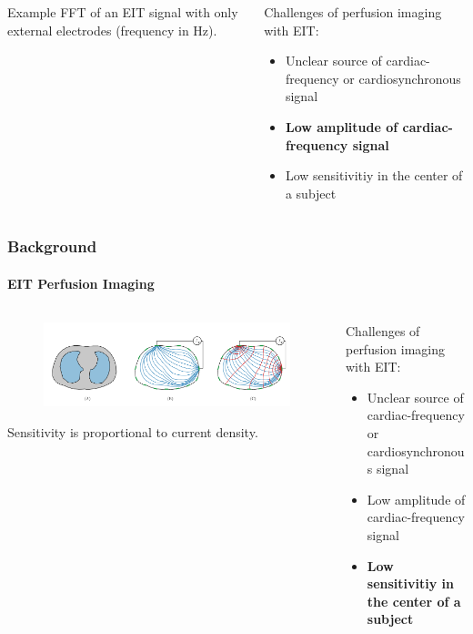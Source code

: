 \documentclass[10pt,    %
    english,            %
    xcolor=table,       %
    envcountsect,        %
    aspectratio=1610
]{beamer}
\begin{document}
\begin{frame}
\begin{columns}[c]
\begin{column}{0.5\textwidth}
\begin{figure}
	\end{figure}
	Example FFT of an EIT signal with only external electrodes (\alert{frequency in Hz}).
\end{column}
\begin{column}{0.5\textwidth}
	Challenges of perfusion imaging with EIT: \\ \vspace{5mm}
	\begin{itemize}
		\item Unclear source of cardiac-frequency or cardiosynchronous signal
		\item \textbf{Low amplitude of cardiac-frequency signal}
		\item Low sensitivitiy in the center of a subject
	\end{itemize}
\end{column}
\end{columns}
\end{frame}

\begin{frame}
	\frametitle{Background}
	\framesubtitle{EIT Perfusion Imaging}
\begin{columns}[c]
\begin{column}{0.5\textwidth}
	\begin{figure}
		\centering
	\includegraphics[width=\textwidth,trim={16cm 3cm 16cm 0},clip]{imgs/current_and_equipotential_lines.pdf}
	\end{figure}
	\alert{Sensitivity} is proportional to \alert{current density}.
\end{column}
\begin{column}{0.5\textwidth}
	Challenges of perfusion imaging with EIT: \\ \vspace{5mm}
	\begin{itemize}
		\item Unclear source of cardiac-frequency or cardiosynchronous signal
		\item Low amplitude of cardiac-frequency signal
		\item \textbf{Low sensitivitiy in the center of a subject}
	\end{itemize}
\end{column}
\end{columns}
\end{frame}
\end{document}
